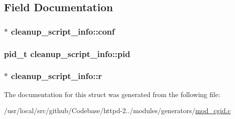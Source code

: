 \subsection{Field Documentation}
\subsubsection[{\texorpdfstring{conf}{conf}}]{$\ast$ cleanup\+\_\+script\+\_\+info\+::conf}\hypertarget{structcleanup__script__info_a932cba36eca403e4547e8b92faef2c88}{}\label{structcleanup__script__info_a932cba36eca403e4547e8b92faef2c88}
\subsubsection[{\texorpdfstring{pid}{pid}}]{\setlength{\rightskip}{0pt plus 5cm}pid\+\_\+t cleanup\+\_\+script\+\_\+info\+::pid}\hypertarget{structcleanup__script__info_aa5ea8772148c3cbc04537ec13893c7e8}{}\label{structcleanup__script__info_aa5ea8772148c3cbc04537ec13893c7e8}
\subsubsection[{\texorpdfstring{r}{r}}]{$\ast$ cleanup\+\_\+script\+\_\+info\+::r}\hypertarget{structcleanup__script__info_a22b7a94bd0fc7d62f135642fd045c8eb}{}\label{structcleanup__script__info_a22b7a94bd0fc7d62f135642fd045c8eb}


The documentation for this struct was generated from the following file\+:\begin{DoxyCompactItemize}
\item 
/usr/local/src/github/\+Codebase/httpd-\/2../modules/generators/\hyperlink{mod__cgid_8c}{mod\+\_\+cgid.\+c}\end{DoxyCompactItemize}
